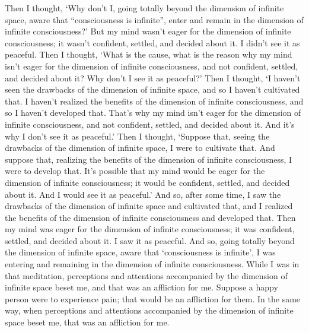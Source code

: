 \documentclass[12pt,openany]{book}%
\begin{document}
Then I thought, ‘Why don’t I, going totally beyond the dimension of infinite space, aware that “consciousness is infinite”, enter and remain in the dimension of infinite consciousness?’ But my mind wasn’t eager for the dimension of infinite consciousness; it wasn’t confident, settled, and decided about it. I didn’t see it as peaceful. Then I thought, ‘What is the cause, what is the reason why my mind isn’t eager for the dimension of infinite consciousness, and not confident, settled, and decided about it? Why don’t I see it as peaceful?’ Then I thought, ‘I haven’t seen the drawbacks of the dimension of infinite space, and so I haven’t cultivated that. I haven’t realized the benefits of the dimension of infinite consciousness, and so I haven’t developed that. That’s why my mind isn’t eager for the dimension of infinite consciousness, and not confident, settled, and decided about it. And it’s why I don’t see it as peaceful.’ Then I thought, ‘Suppose that, seeing the drawbacks of the dimension of infinite space, I were to cultivate that. And suppose that, realizing the benefits of the dimension of infinite consciousness, I were to develop that. It’s possible that my mind would be eager for the dimension of infinite consciousness; it would be confident, settled, and decided about it. And I would see it as peaceful.’ And so, after some time, I saw the drawbacks of the dimension of infinite space and cultivated that, and I realized the benefits of the dimension of infinite consciousness and developed that. Then my mind was eager for the dimension of infinite consciousness; it was confident, settled, and decided about it. I saw it as peaceful. And so, going totally beyond the dimension of infinite space, aware that ‘consciousness is infinite’, I was entering and remaining in the dimension of infinite consciousness. While I was in that meditation, perceptions and attentions accompanied by the dimension of infinite space beset me, and that was an affliction for me. Suppose a happy person were to experience pain; that would be an affliction for them. In the same way, when perceptions and attentions accompanied by the dimension of infinite space beset me, that was an affliction for me. 
\end{document}
